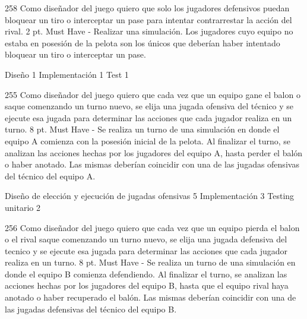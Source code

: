 \vspace{1cm}
	

\sprintstory
{258}
{Como diseñador del juego quiero que solo los jugadores defensivos puedan bloquear un tiro o interceptar un pase para intentar contrarrestar la acción del rival.}
{2 pt.}
{Must Have}
{-}
{Realizar una simulación. Los jugadores cuyo equipo no estaba en posesión de la pelota son los únicos que deberían haber intentado bloquear un tiro o interceptar un pase.}

\begin{taskstable}
 \task
 {Diseño}
 {1}
 \task
 {Implementación}
 {1}
 \task
 {Test}
 {1}
\end{taskstable}

\vspace{1cm}


\sprintstory
{255}
{Como diseñador del juego quiero que cada vez que un equipo gane el balon o saque comenzando un turno nuevo, se elija una jugada ofensiva del técnico y se ejecute esa jugada para determinar las acciones que cada jugador realiza en un turno.}
{8 pt.}
{Must Have}
{-}
{Se realiza un turno de una simulación en donde el equipo A comienza con la posesión inicial de la pelota. Al finalizar el turno, se analizan las acciones
hechas por los jugadores del equipo A, hasta perder el balón o haber anotado. Las mismas deberían coincidir con una de las jugadas ofensivas del técnico del equipo A. }

\begin{taskstable}
 \task
 {Diseño de elección y ejecución de jugadas ofensivas}
 {5}
 \task
 {Implementación}
 {3}
 \task
 {Testing unitario}
 {2}
\end{taskstable}

\vspace{1cm}


\sprintstory
{256}
{Como diseñador del juego quiero que cada vez que un equipo pierda el balon o el rival saque comenzando un turno nuevo, se elija una jugada defensiva del tecnico y se ejecute esa jugada para determinar las acciones que cada jugador realiza en un turno.}
{8 pt.}
{Must Have}
{-}
{Se realiza un turno de una simulación en donde el equipo B comienza defendiendo. Al finalizar el turno, se analizan las acciones
hechas por los jugadores del equipo B, hasta que el equipo rival haya anotado o haber recuperado el balón. Las mismas deberían coincidir con una de las jugadas defensivas del técnico del equipo B.  }

